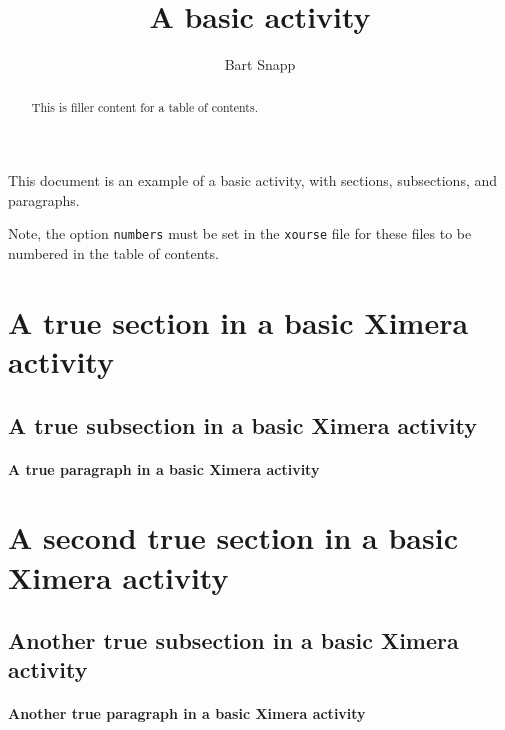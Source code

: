 \documentclass{ximera}
\author{Bart Snapp}
\title{A basic activity}
\begin{document}
\begin{abstract}
    This is filler content for a table of contents.
\end{abstract}
\maketitle

This document is an example of a basic activity, with sections, subsections, and paragraphs.


Note, the option \verb!numbers! must be set in the \verb!xourse! file for these
files to be numbered in the table of contents.




\section{A true section in a basic Ximera activity}
\lipsum[1]


\subsection{A true subsection in a basic Ximera activity}
\lipsum[1]

\paragraph{A true paragraph in a basic Ximera activity}
\lipsum[1]


\section{A second true section in a basic Ximera activity}
\lipsum[1]


\subsection{Another true subsection in a basic Ximera activity}
\lipsum[1]

\paragraph{Another true paragraph in a basic Ximera activity}
\lipsum[1]
\end{document}
